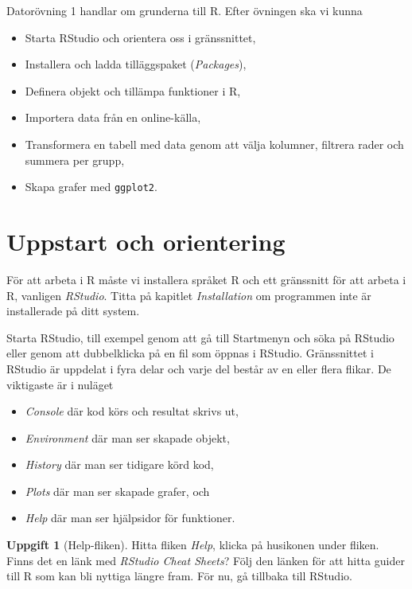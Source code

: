 \documentclass[
]{book}
\providecommand{\tightlist}{%
  \setlength{\itemsep}{0pt}\setlength{\parskip}{0pt}}
\theoremstyle{definition}
\theoremstyle{definition}
\theoremstyle{definition}
\newtheorem{exercise}{Uppgift}[chapter]
\theoremstyle{definition}
\theoremstyle{remark}
\begin{document}
Datorövning 1 handlar om grunderna till R. Efter övningen ska vi kunna

\begin{itemize}
\item
  Starta RStudio och orientera oss i gränssnittet,
\item
  Installera och ladda tilläggspaket (\emph{Packages}),
\item
  Definera objekt och tillämpa funktioner i R,
\item
  Importera data från en online-källa,
\item
  Transformera en tabell med data genom att välja kolumner, filtrera rader och summera per grupp,
\item
  Skapa grafer med \texttt{ggplot2}.
\end{itemize}

\hypertarget{uppstart-och-orientering}{%
\section{Uppstart och orientering}\label{uppstart-och-orientering}}

För att arbeta i R måste vi installera språket R och ett gränssnitt för att arbeta i R, vanligen \emph{RStudio}. Titta på kapitlet \emph{Installation} om programmen inte är installerade på ditt system.

Starta RStudio, till exempel genom att gå till Startmenyn och söka på RStudio eller genom att dubbelklicka på en fil som öppnas i RStudio.
Gränssnittet i RStudio är uppdelat i fyra delar och varje del består av en eller flera flikar. De viktigaste är i nuläget

\begin{itemize}
\tightlist
\item
  \emph{Console} där kod körs och resultat skrivs ut,
\item
  \emph{Environment} där man ser skapade objekt,
\item
  \emph{History} där man ser tidigare körd kod,
\item
  \emph{Plots} där man ser skapade grafer, och
\item
  \emph{Help} där man ser hjälpsidor för funktioner.
\end{itemize}

\begin{exercise}[Help-fliken]
Hitta fliken \emph{Help}, klicka på husikonen under fliken. Finns det en länk med \emph{RStudio Cheat Sheets}? Följ den länken för att hitta guider till R som kan bli nyttiga längre fram. För nu, gå tillbaka till RStudio.
\end{exercise}
\end{document}
